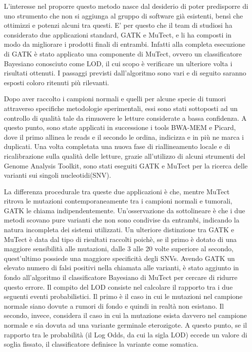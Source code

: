 L'interesse nel proporre questo metodo nasce dal desiderio di poter predisporre di uno strumento che non si aggiunga al gruppo di software già esistenti, bensì che ottimizzi e potenzi alcuni tra questi.
E' per questo che il team di studiosi ha considerato due applicazioni standard, GATK e MuTect, e li ha composti in modo da migliorare i prodotti finali di entrambi.
Infatti alla completa esecuzione di GATK è stato applicato una componente di MuTect, ovvero un classificatore Bayesiano conosciuto come LOD, il cui scopo è verificare un ulteriore volta i risultati ottenuti.
I passaggi previsti dall'algoritmo sono vari e di seguito saranno esposti coloro ritenuti più rilevanti.

Dopo aver raccolto i campioni normali e quelli per alcune specie di tumori attraverso specifiche metodologie sperimentali, essi sono stati sottoposti ad un controllo di qualità tale da rimuovere le letture considerate a bassa confidenza.
A questo punto, sono state applicati in successione i tools BWA-MEM e Picard, dove il primo allinea le reads e il secondo le ordina, indicizza e in più ne marca i duplicati.
Una volta completata una nuova fase di riallineamento locale e di ricalibrazione sulla qualità delle letture, grazie all'utilizzo di alcuni strumenti del Genome Analysis Toolkit, sono stati eseguiti GATK e MuTect per la ricerca delle varianti sui singoli nucleotidi(SNV).

La differenza procedurale tra queste due applicazioni è che, mentre MuTect ritrova le mutazioni contemporaneamente tra i campioni normali e tumorali, GATK le chiama indipendentemente.
Un'osservazione da sottolineare è che i due metodi scovano pure varianti che non sono condivise da entrambi, indicando la natura incompleta dei sistemi utilizzati.
Un ulteriore distinzione tra GATK e MuTect è data dal tipo di risultati raccolti poichè, se il primo è dotato di una maggiore sensibilità alle mutazioni, dalle 3 alle 20 volte superiore al secondo, quest'ultimo possiede una maggiore specificità degli SNVs.
Avendo GATK un elevato numero di falsi positivi nella chiamata alle varianti, è stato aggiunto in fondo all'algoritmo il classificatore Bayesiano di MuTect per cercare di ridurre questo errore.
Il compito del LOD consiste nel calcolare il rapporto tra i due seguenti eventi probabilistici.
Il primo è il caso in cui le mutazioni nel campione normale siano dovute a rumori di fondo e quindi in realtà non esistano.
Il secondo, invece, considera il caso in cui la mutazione esista davvero nel campione normale e sia dovuta ad una variante germinale eterozigote.
A questo punto, se il rapporto tra le probabilità (il Log Odds, da cui la sigla LOD) eccede un valore di soglia fissato, il classificatore definisce la variante come somatica.

